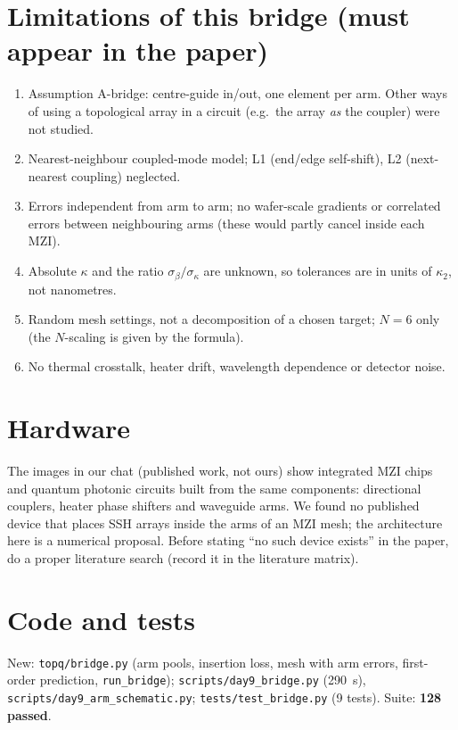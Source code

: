 \documentclass[10pt,a4paper]{article}
\newcommand{\kc}{\kappa_2}
\begin{document}
\section{Limitations of this bridge (must appear in the paper)}
\begin{enumerate}[itemsep=1pt]
\item Assumption A-bridge: centre-guide in/out, one element per arm. Other ways of using a topological array in a circuit (e.g.\ the array \emph{as} the coupler) were not studied.
\item Nearest-neighbour coupled-mode model; L1 (end/edge self-shift), L2 (next-nearest coupling) neglected.
\item Errors independent from arm to arm; no wafer-scale gradients or correlated errors between neighbouring arms (these would partly cancel inside each MZI).
\item Absolute $\kappa$ and the ratio $\sigma_\beta/\sigma_\kappa$ are unknown, so tolerances are in units of $\kc$, not nanometres.
\item Random mesh settings, not a decomposition of a chosen target; $N=6$ only (the $N$-scaling is given by the formula).
\item No thermal crosstalk, heater drift, wavelength dependence or detector noise.
\end{enumerate}

\section{Hardware}
The images in our chat (published work, not ours) show integrated MZI chips and quantum photonic circuits built from the same components: directional couplers, heater phase shifters and waveguide arms. We found no published device that places SSH arrays inside the arms of an MZI mesh; the architecture here is a numerical proposal. Before stating ``no such device exists'' in the paper, do a proper literature search (record it in the literature matrix).

\section{Code and tests}
New: \texttt{topq/bridge.py} (arm pools, insertion loss, mesh with arm errors, first-order prediction, \texttt{run\_bridge}); \texttt{scripts/day9\_bridge.py} (290~s), \texttt{scripts/day9\_arm\_schematic.py}; \texttt{tests/test\_bridge.py} (9 tests). Suite: \textbf{128 passed}.
\end{document}
